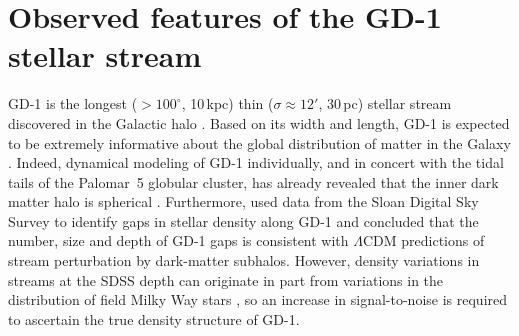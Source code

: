 \documentclass[twocolumn]{aastex62}
\newcommand{\articlename}{\textsl{Letter}}
\newcommand{\sectionname}{Section}
\begin{document}
% 


\section{Observed features of the GD-1 stellar stream}
\label{sec:data}
GD-1 is the longest ($>100^\circ$, 10\,kpc) thin ($\sigma\approx12'$, 30\,pc) stellar stream discovered in the Galactic halo \citep{gd2006}.
Based on its width and length, GD-1 is expected to be extremely informative about the global distribution of matter in the Galaxy \citep{lux2013, bh2018}.
Indeed, dynamical modeling of GD-1 individually, and in concert with the tidal tails of the Palomar~5 globular cluster, has already revealed that the inner dark matter halo is spherical \citep{koposov2010, bowden2015, bovy2016}.
Furthermore, \citet{cg2013} used data from the Sloan Digital Sky Survey \citep[SDSS,][]{york2000} to identify gaps in stellar density along GD-1 and concluded that the number, size and depth of GD-1 gaps is consistent with $\Lambda$CDM predictions of stream perturbation by dark-matter subhalos.
However, density variations in streams at the SDSS depth can originate in part from variations in the distribution of field Milky Way stars \citep{ibata2016}, so an increase in signal-to-noise is required to ascertain the true density structure of GD-1.
\end{document}
